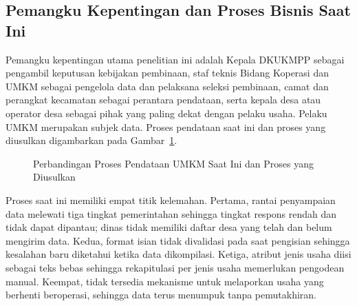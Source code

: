 \subsection{Pemangku Kepentingan dan Proses Bisnis Saat Ini}

Pemangku kepentingan utama penelitian ini adalah Kepala DKUKMPP sebagai pengambil keputusan kebijakan pembinaan, staf teknis Bidang Koperasi dan UMKM sebagai pengelola data dan pelaksana seleksi pembinaan, camat dan perangkat kecamatan sebagai perantara pendataan, serta kepala desa atau operator desa sebagai pihak yang paling dekat dengan pelaku usaha. Pelaku UMKM merupakan subjek data. Proses pendataan saat ini dan proses yang diusulkan digambarkan pada Gambar~\ref{fig:asis-tobe}.

\begin{figure}[H]
  \centering
  \caption{Perbandingan Proses Pendataan UMKM Saat Ini dan Proses yang Diusulkan}
  \label{fig:asis-tobe}
\end{figure}

Proses saat ini memiliki empat titik kelemahan. Pertama, rantai penyampaian data melewati tiga tingkat pemerintahan sehingga tingkat respons rendah dan tidak dapat dipantau; dinas tidak memiliki daftar desa yang telah dan belum mengirim data. Kedua, format isian tidak divalidasi pada saat pengisian sehingga kesalahan baru diketahui ketika data dikompilasi. Ketiga, atribut jenis usaha diisi sebagai teks bebas sehingga rekapitulasi per jenis usaha memerlukan pengodean manual. Keempat, tidak tersedia mekanisme untuk melaporkan usaha yang berhenti beroperasi, sehingga data terus menumpuk tanpa pemutakhiran.

